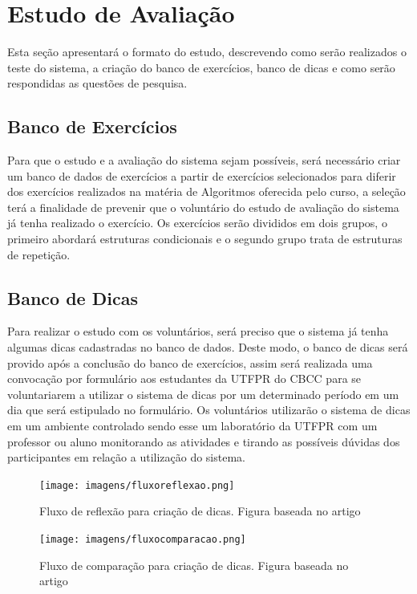 \section{Estudo de Avaliação}

Esta seção apresentará o formato do estudo, descrevendo como serão realizados o teste do sistema, a criação do banco de exercícios, banco de dicas e como serão respondidas as questões de pesquisa.

\subsection{Banco de Exercícios}

Para que o estudo e a avaliação do sistema sejam possíveis, será necessário criar um banco de dados de exercícios a partir de exercícios selecionados para diferir dos exercícios realizados na matéria de Algoritmos oferecida pelo curso, a seleção terá a finalidade de prevenir que o voluntário do estudo de avaliação do sistema já tenha realizado o exercício. Os exercícios serão divididos em dois grupos, o primeiro abordará estruturas condicionais e o segundo grupo trata de estruturas de repetição.

\subsection{Banco de Dicas}

Para realizar o estudo com os voluntários, será preciso que o sistema já tenha algumas dicas cadastradas no banco de dados. Deste modo, o banco de dicas será provido após a conclusão do banco de exercícios, assim será realizada uma convocação por formulário  aos estudantes da UTFPR do CBCC para se voluntariarem a utilizar o sistema de dicas por um determinado período em um dia que será estipulado no formulário. Os voluntários utilizarão o sistema de dicas em um ambiente controlado sendo esse um laboratório da UTFPR com um professor ou aluno monitorando as atividades e tirando as possíveis dúvidas dos participantes em relação a utilização do sistema. 

\begin{figure}[]
	\centering
	\captionsetup{justification=centering}
	\texttt{[image: imagens/fluxoreflexao.png]}
	\caption{Fluxo de reflexão para criação de dicas. Figura baseada no artigo \cite{Glassman:2016:LPH:2818048.2820011}}
	\label{figura:fluxoreflexao}
\end{figure}

\begin{figure}[]
	\centering
	\captionsetup{justification=centering}
	\texttt{[image: imagens/fluxocomparacao.png]}
	\caption{Fluxo de comparação para criação de dicas. Figura baseada no artigo \cite{Glassman:2016:LPH:2818048.2820011}}
	\label{figura:fluxocomparacao}
\end{figure}

